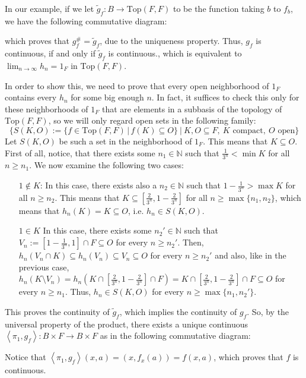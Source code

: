 \begin{example}
In our example, if we let $\tilde{g}_f:B\to\mathrm{Top}(F,F)$ to be the function taking $b$ to $f_b$, we have the following commutative diagram:
\begin{center}
\end{center}
which proves that $g_f^{\#}=\tilde{g}_f$, due to the uniqueness property. Thus, $g_f$ is continuous, if and only if $\tilde{g}_f$ is continuous., which is equivalent to $\lim_{n\to\infty}h_n=1_F$ in $\mathrm{Top}(F,F)$.

In order to show this, we need to prove that every open neighborhood of $1_F$ contains every $h_n$ for some big enough $n$. In fact, it suffices to check this only for these neighborhoods of $1_F$ that are elements in a subbasis of the topology of $\mathrm{Top}(F,F)$, so we will only regard open sets in the following family:
\[\Big\{S(K,O):=\{f\in\mathrm{Top}(F,F)\,|\,f(K)\subseteq O\}\ \Big|\ K,O\subseteq F,\ K\text{ compact},\ O\text{ open}\Big\}\]
Let $S(K,O)$ be such a set in the neighborhood of $1_F$. This means that $K\subseteq O$. First of all, notice, that there exists some $n_1\in\mathbb{N}$ such that $\frac{1}{3^n}<\min K$ for all $n\geq n_1$. We now examine the following two cases:
\begin{itemize}
\item[$1\not\in K$:] In this case, there exists also a $n_2\in\mathbb{N}$ such that $1-\frac{1}{3^n}>\max K$ for all $n\geq n_2$. This means that $K\subseteq[\frac{2}{3^n},1-\frac{2}{3^n}]$ for all $n\geq\max\{n_1,n_2\}$, which means that $h_n(K)=K\subseteq O$, i.e. $h_n\in S(K,O)$.
\item[$1\in K$] In this case, there exists some $n_2'\in\mathbb{N}$ such that $V_n:=[1-\frac{1}{3^n},1]\cap F\subseteq O$ for every $n\geq n_2'$. Then, $h_n(V_n\cap K)\subseteq h_n(V_n)\subseteq V_n\subseteq O$ for every $n\geq n_2'$ and also, like in the previous case, $h_n(K\setminus V_n)= h_n(K\cap[\frac{2}{3^n},1-\frac{2}{3^n}]\cap F)=K\cap[\frac{2}{3^n},1-\frac{2}{3^n}]\cap F\subseteq O$ for every $n\geq n_1$. Thus, $h_n\in S(K,O)$ for every $n\geq\max\{n_1,n_2'\}$.
\end{itemize}
This proves the continuity of $\tilde{g}_f$, which implies the continuity of $g_f$. So, by the universal property of the product, there exists a unique continuous $\left<\pi_1,g_f\right>:B\times F\to B\times F$ as in the following commutative diagram:
\begin{center}
\end{center}
Notice that $\left<\pi_1,g_f\right>(x,a)=(x,f_x(a))=f(x,a)$, which proves that $f$ is continuous.


\end{example}
